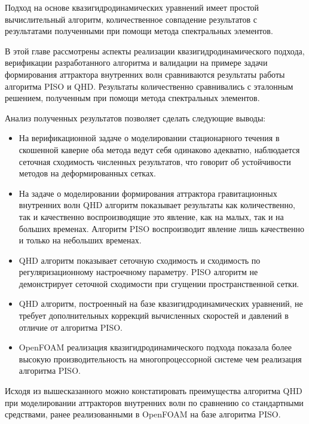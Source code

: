 Подход на основе квазигидродинамических уравнений имеет простой вычислительный алгоритм, количественное совпадение результатов с результатами полученными при помощи метода спектральных элементов.

В этой главе рассмотрены аспекты реализации квазигидродинамического подхода, верификации разработанного алгоритма и валидации на примере задачи формирования аттрактора внутренних волн сравниваются результаты работы алгоритма PISO и QHD. Результаты количественно сравнивались с эталонным решением, полученным при помощи метода спектральных элементов.

Анализ полученных результатов позволяет сделать следующие выводы:
\begin{itemize}
    \item На верификационной задаче о моделировании стационарного течения в скошенной каверне оба метода ведут себя одинаково адекватно, наблюдается сеточная сходимость численных результатов, что говорит об устойчивости методов на деформированных сетках.
    \item На задаче о моделировании формирования аттрактора гравитационных внутренних волн QHD алгоритм показывает результаты как количественно, так и качественно воспроизводящие это явление, как на малых, так и на больших временах. Алгоритм PISO воспроизводит явление лишь качественно и только на небольших временах.
    \item QHD алгоритм показывает сеточную сходимость и сходимость по регуляризационному настроечному параметру. PISO алгоритм не демонстрирует сеточной сходимости при сгущении пространственной сетки.
    \item QHD алгоритм, построенный на базе квазигидродинамических уравнений, не требует дополнительных коррекций вычисленных скоростей и давлений в отличие от алгоритма PISO.
    \item OpenFOAM реализация квазигидродинамического подхода показала более высокую производительность на многопроцессорной системе чем реализация алгоритма PISO.
\end{itemize}

Исходя из вышесказанного можно констатировать преимущества алгоритма QHD при моделировании аттракторов внутренних волн по сравнению со стандартными средствами, ранее реализованными в OpenFOAM на базе алгоритма PISO. 

